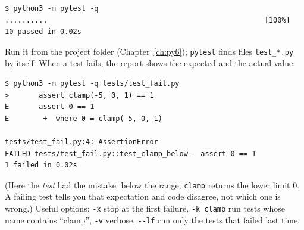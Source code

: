 \begin{verbatim}
$ python3 -m pytest -q
..........                                                   [100%]
10 passed in 0.02s
\end{verbatim}
Run it from the project folder (Chapter~\ref{ch:py6}); \texttt{pytest} finds files \texttt{test\_*.py} by itself. When a test fails, the report shows the expected and the actual value:
\begin{verbatim}
$ python3 -m pytest -q tests/test_fail.py
>       assert clamp(-5, 0, 1) == 1
E       assert 0 == 1
E        +  where 0 = clamp(-5, 0, 1)

tests/test_fail.py:4: AssertionError
FAILED tests/test_fail.py::test_clamp_below - assert 0 == 1
1 failed in 0.02s
\end{verbatim}
(Here the \emph{test} had the mistake: below the range, \texttt{clamp} returns the lower limit $0$. A failing test tells you that expectation and code disagree, not which one is wrong.) Useful options: \verb!-x! stop at the first failure, \verb!-k clamp! run tests whose name contains ``clamp'', \verb!-v! verbose, \verb!--lf! run only the tests that failed last time.

\begin{center}
\label{fig:py11_tdd}
\end{center}

